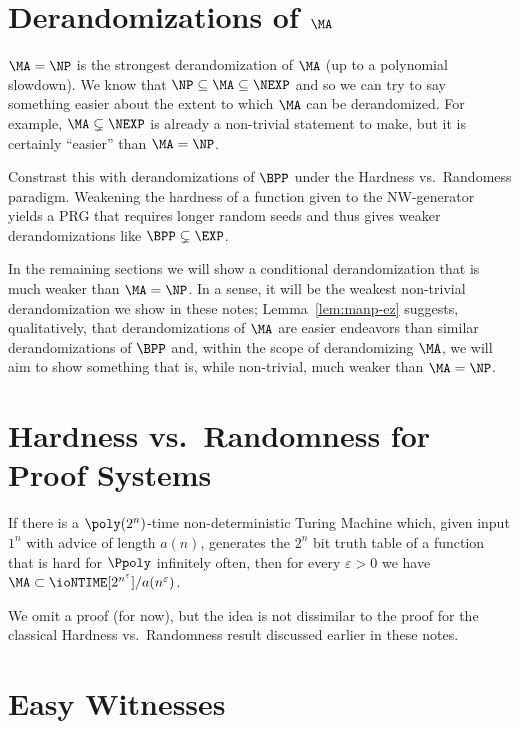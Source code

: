 \section[\texorpdfstring{Derandomizations of $\MA$}{Derandomizations of MA}]{Derandomizations of $\MA$}

$\MA = \NP$ is the strongest derandomization of $\MA$ (up to a polynomial slowdown).
We know that $\NP \subseteq \MA \subseteq \NEXP$ and so we can try to say something easier
about the extent to which $\MA$ can be derandomized.
For example, $\MA \subsetneq \NEXP$ is already a non-trivial statement to make, but
it is certainly ``easier'' than $\MA = \NP$.

Constrast this with derandomizations of $\BPP$ under the Hardness vs.\ Randomess paradigm.
Weakening the hardness of a function given to the NW-generator yields a PRG that requires 
longer random seeds and thus gives weaker derandomizations like $\BPP \subsetneq \EXP$.

In the remaining sections we will show a conditional derandomization that is much weaker 
than $\MA = \NP$.
In a sense, it will be the weakest non-trivial derandomization we show in these notes;
Lemma~\ref{lem:manp-ez} suggests, qualitatively, that derandomizations of $\MA$ are 
easier endeavors than similar derandomizations of $\BPP$ and, within the scope of 
derandomizing $\MA$, we will aim to show something that is, while non-trivial, much 
weaker than $\MA = \NP$.

\section{Hardness vs.\ Randomness for Proof Systems}

\begin{theorem}\label{thm:hr-ma}
  If there is a $\poly(2^n)$-time non-deterministic Turing Machine which, given input 
  $1^n$ with advice of length $a(n)$, generates the $2^n$ bit truth table of a function
  that is hard for $\Ppoly$ infinitely often, then for every $\varepsilon > 0$ we have 
  $\MA \subset \ioNTIME[2^{n^\varepsilon}]/a(n^\varepsilon)$.
\end{theorem}
\begin{proofsk}
  We omit a proof (for now), but the idea is not dissimilar to the proof for the classical 
  Hardness vs.\ Randomness result discussed earlier in these notes.
\end{proofsk}

\section{Easy Witnesses}
